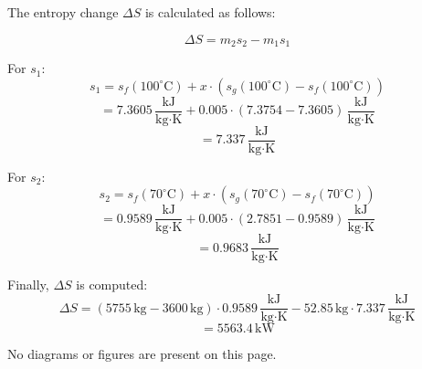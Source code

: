 The entropy change \( \Delta S \) is calculated as follows:  

\[
\Delta S = m_2 s_2 - m_1 s_1
\]

For \( s_1 \):  
\[
s_1 = s_f(100^\circ\text{C}) + x \cdot \left( s_g(100^\circ\text{C}) - s_f(100^\circ\text{C}) \right)
\]
\[
= 7.3605 \, \frac{\text{kJ}}{\text{kg·K}} + 0.005 \cdot \left( 7.3754 - 7.3605 \right) \, \frac{\text{kJ}}{\text{kg·K}}
\]
\[
= 7.337 \, \frac{\text{kJ}}{\text{kg·K}}
\]

For \( s_2 \):  
\[
s_2 = s_f(70^\circ\text{C}) + x \cdot \left( s_g(70^\circ\text{C}) - s_f(70^\circ\text{C}) \right)
\]
\[
= 0.9589 \, \frac{\text{kJ}}{\text{kg·K}} + 0.005 \cdot \left( 2.7851 - 0.9589 \right) \, \frac{\text{kJ}}{\text{kg·K}}
\]
\[
= 0.9683 \, \frac{\text{kJ}}{\text{kg·K}}
\]

Finally, \( \Delta S \) is computed:  
\[
\Delta S = \left( 5755 \, \text{kg} - 3600 \, \text{kg} \right) \cdot 0.9589 \, \frac{\text{kJ}}{\text{kg·K}} - 52.85 \, \text{kg} \cdot 7.337 \, \frac{\text{kJ}}{\text{kg·K}}
\]
\[
= 5563.4 \, \text{kW}
\]  

No diagrams or figures are present on this page.